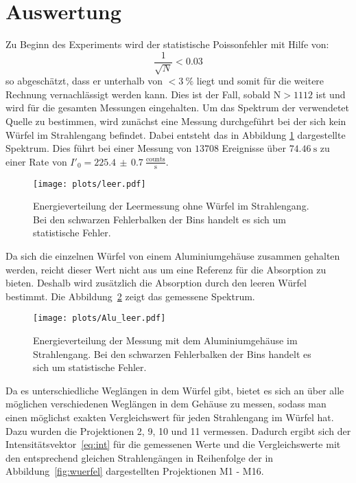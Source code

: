 \section{Auswertung}
Zu Beginn des Experiments wird der statistische Poissonfehler mit Hilfe von:
\begin{equation*}
  \frac{1}{\sqrt{N}} < 0.03
\end{equation*}
so abgeschätzt, dass er unterhalb von $<\SI{3}{\percent}$ liegt und somit für die weitere
Rechnung vernachlässigt werden kann. Dies ist der Fall, sobald $\text{N}>1112$
ist und wird für die gesamten Messungen eingehalten. Um das Spektrum der verwendetet Quelle zu bestimmen, wird zunächst eine Messung durchgeführt bei der sich kein Würfel im Strahlengang befindet. Dabei entsteht das in Abbildung \ref{fig:leer} dargestellte Spektrum. Dies führt bei einer Messung von $13708$ Ereignisse über $\SI{74.46}{\second}$ zu einer Rate von $I'_0 = 225.4\,\pm\,0.7\:\frac{\text{counts}}{\text{s}}$.

\begin{figure}
  \centering
  \texttt{[image: plots/leer.pdf]}
  \caption{Energieverteilung der Leermessung ohne Würfel im Strahlengang. Bei den schwarzen Fehlerbalken der Bins handelt es sich um statistische Fehler.}
  \label{fig:leer}
\end{figure}

Da sich die einzelnen Würfel von einem Aluminiumgehäuse zusammen gehalten werden, reicht dieser Wert nicht aus um eine Referenz für die Absorption zu bieten. Deshalb wird zusätzlich die Absorption durch den leeren Würfel bestimmt.
Die Abbildung~\ref{fig:alu} zeigt das gemessene Spektrum.

\begin{figure}
  \centering
  \texttt{[image: plots/Alu\_leer.pdf]}
  \caption{Energieverteilung der Messung mit dem Aluminiumgehäuse im Strahlengang. Bei den schwarzen Fehlerbalken der Bins handelt es sich um statistische Fehler.}
  \label{fig:alu}
\end{figure}

Da es unterschiedliche Weglängen in dem Würfel gibt, bietet es sich an über alle möglichen verschiedenen Weglängen in dem Gehäuse zu messen, sodass man einen möglichst exakten Vergleichswert für jeden Strahlengang im Würfel hat. Dazu wurden die Projektionen 2, 9, 10 und 11 vermessen. Dadurch ergibt sich der Intensitätsvektor~\ref{eq:int} für die gemessenen Werte und die Vergleichswerte mit den entsprechend gleichen Strahlengängen in Reihenfolge der in Abbildung~\ref{fig:wuerfel} dargestellten Projektionen M1 - M16.

